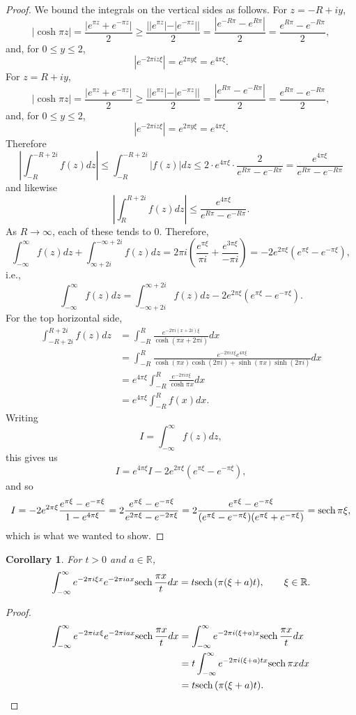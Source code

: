 \documentclass{article}
\newcommand{\sech}{\ensuremath\mathrm{sech}\,}
\newtheorem{corollary}[theorem]{Corollary}
\theoremstyle{definition}
\begin{document}
\begin{proof}
We bound the integrals on the vertical sides as follows.
For $z=-R+iy$,
\[
| \cosh \pi z| = \frac{|e^{\pi z}+e^{-\pi z}|}{2}
\geq \frac{||e^{\pi z}|-|e^{-\pi z}||}{2}
=\frac{|e^{-R\pi} - e^{R\pi}|}{2}
=\frac{e^{R\pi}-e^{-R\pi}}{2},
\]
and, for $0 \leq y \leq 2$,
\[
|e^{-2\pi iz\xi}| = e^{2\pi y\xi} = e^{4\pi \xi}.
\]
For $z=R+iy$,
\[
| \cosh \pi z| = \frac{|e^{\pi z}+e^{-\pi z}|}{2}
\geq \frac{||e^{\pi z}|-|e^{-\pi z}||}{2}
=\frac{|e^{R\pi} - e^{-R\pi}|}{2}
=\frac{e^{R\pi}-e^{-R\pi}}{2},
\]
and, for $0 \leq y \leq 2$,
\[
|e^{-2\pi iz\xi}| = e^{2\pi y\xi} = e^{4\pi \xi}.
\]
Therefore
\[
\left| \int_{-R}^{-R+2i} f(z) dz \right|
\leq \int_{-R}^{-R+2i} |f(z)| dz
\leq 2\cdot  e^{4\pi \xi} \cdot \frac{2}{e^{R\pi}-e^{-R\pi}}
=\frac{e^{4\pi \xi}}{e^{R\pi}-e^{-R\pi}}
\]
and likewise
\[
\left| \int_{R}^{R+2i} f(z) dz \right| \leq \frac{e^{4\pi \xi}}{e^{R\pi}-e^{-R\pi}}.
\]
As $R \to \infty$, each of these tends to $0$.
Therefore,
\[
\int_{-\infty}^\infty f(z) dz + \int_{\infty+2i}^{-\infty+2i} f(z)dz 
=2\pi i \left(\frac{e^{\pi \xi}}{\pi i}+\frac{e^{3\pi \xi}}{-\pi i}\right)
=-2 e^{2\pi \xi}(e^{\pi \xi}-e^{-\pi \xi}),
\]
i.e.,
\[
\int_{-\infty}^\infty f(z) dz = 
 \int_{-\infty+2i}^{\infty+2i} f(z)dz 
 -2 e^{2\pi \xi}(e^{\pi \xi}-e^{-\pi \xi}).
\]
For the top horizontal side, 
\begin{align*}
\int_{-R+2i}^{R+2i} f(z) dz 
&=\int_{-R}^R \frac{e^{-2\pi i(x+2i)\xi}}{\cosh (\pi x+2\pi i)} dx\\
&=\int_{-R}^R \frac{e^{-2\pi ix\xi} e^{4\pi \xi}}{\cosh (\pi x)\cosh(2\pi i)+\sinh(\pi x)\sinh(2\pi i)} dx\\
&=e^{4\pi \xi} \int_{-R}^R \frac{e^{-2\pi ix\xi}}{\cosh \pi x} dx\\
&=e^{4\pi \xi} \int_{-R}^R f(x) dx.
\end{align*}
Writing
\[
I=\int_{-\infty}^\infty f(z) dz,
\]
this gives us
\[
I = e^{4\pi \xi} I  -2 e^{2\pi \xi}(e^{\pi \xi}-e^{-\pi \xi}),
\]
and so
\[
I=-2 e^{2\pi \xi} \frac{e^{\pi \xi}-e^{-\pi \xi}}{1-e^{4\pi \xi}}
=2 \frac{e^{\pi \xi}-e^{-\pi \xi}}{e^{2\pi \xi}-e^{-2\pi \xi}}
=2 \frac{e^{\pi \xi}-e^{-\pi \xi}}{(e^{\pi \xi}-e^{-\pi \xi})(e^{\pi \xi}+e^{-\pi \xi})}
=\sech \pi \xi,
\]
which is what we wanted to show.
\end{proof}


\begin{corollary}
For $t>0$ and $a \in \mathbb{R}$,
\[
\int_{-\infty}^\infty e^{-2\pi i\xi x} e^{-2\pi iax} \sech \frac{\pi x}{t} dx = t \sech (\pi(\xi+a)t),
\qquad \xi \in \mathbb{R}.
\]
\label{sechfourier}
\end{corollary}
\begin{proof}
\begin{align*}
\int_{-\infty}^\infty e^{-2\pi ix\xi} e^{-2\pi iax} \sech \frac{\pi x}{t} dx
&=\int_{-\infty}^\infty e^{-2\pi i(\xi+a)x} \sech \frac{\pi x}{t} dx\\
&=t \int_{-\infty}^\infty e^{-2\pi i(\xi +a) tx} \sech \pi x dx\\
&=t \sech (\pi(\xi+a)t).
\end{align*}
\end{proof}
\end{document}
